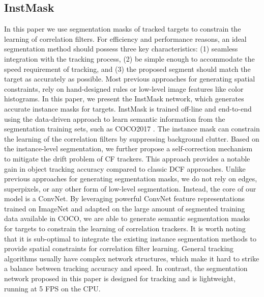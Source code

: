 \documentclass[review]{elsarticle}
\begin{document}
\begin{CJK*}{UTF8}{gbsn}
\subsection{InstMask}
\label{sec:InstMask}
In this paper we use segmentation masks of tracked targets to constrain the learning of correlation filters. For efficiency and performance reasons, an ideal segmentation method should possess three key characteristics: (1) seamless integration with the tracking process, (2) be simple enough to accommodate the speed requirement of tracking, and (3) the proposed segment should match the target as accurately as possible.
Most previous approaches for generating spatial constraints, rely on hand-designed rules or low-level image features like color histograms.
In this paper, we present the InstMask network, which generates accurate instance masks for targets. InstMask is trained off-line and end-to-end using the data-driven approach to learn semantic information from the segmentation training sets, such as COCO2017 \cite{Lin2014MicrosoftCC}. The instance mask can constrain the learning of the correlation filters by suppressing background clutter. Based on the instance-level segmentation, we further propose a self-correction mechanism to mitigate the drift problem of CF trackers. This approach provides a notable gain in object tracking accuracy compared to classic DCF approaches.
Unlike previous approaches for generating segmentation masks, we do not rely on edges, superpixels, or any other form of low-level segmentation. Instead, the core of our model is a ConvNet. By leveraging powerful ConvNet feature representations trained on ImageNet and adapted on the large amount of segmented training data available in COCO, we are able to generate semantic segmentation masks for targets to constrain the learning of correlation trackers.
It is worth noting that it is sub-optimal to integrate the existing instance segmentation methods to provide spatial constraints for correlation filter learning. General tracking algorithms usually have complex network structures, which make it hard to strike a balance between tracking accuracy and speed. In contrast, the segmentation network proposed in this paper is designed for tracking and is lightweight, running at 5 FPS on the CPU.


\end{CJK*}
\end{document}

